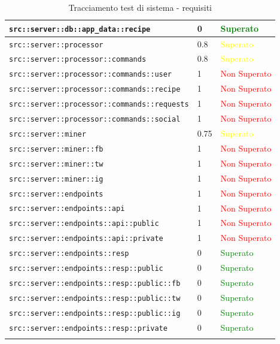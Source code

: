 \begin{center}
\begin{longtable}{| p{8.5cm} | p{3.5cm} | p{3cm} |}
					\hline
					\texttt{src::server::db::app\_data::recipe} & 0 & \textcolor{green}{Superato}\\
					\hline
					\texttt{src::server::processor} & 0.8 & \textcolor{yellow}{Superato}\\
					\hline
					\texttt{src::server::processor::commands} & 0.8 & \textcolor{yellow}{Superato}\\
					\hline
					\texttt{src::server::processor::commands::user} & 1 & \textcolor{red}{Non Superato}\\
					\hline
					\texttt{src::server::processor::commands::recipe} & 1 & \textcolor{red}{Non Superato}\\
					\hline
					\texttt{src::server::processor::commands::requests} & 1 & \textcolor{red}{Non Superato}\\
					\hline
					\texttt{src::server::processor::commands::social} & 1 & \textcolor{red}{Non Superato}\\
					\hline
					\texttt{src::server::miner} & 0.75 & \textcolor{yellow}{Superato}\\
					\hline
					\texttt{src::server::miner::fb} & 1 & \textcolor{red}{Non Superato}\\
					\hline
					\texttt{src::server::miner::tw} & 1 & \textcolor{red}{Non Superato}\\
					\hline
					\texttt{src::server::miner::ig} & 1 & \textcolor{red}{Non Superato}\\
					\hline
					\texttt{src::server::endpoints} & 1 & \textcolor{red}{Non Superato}\\
					\hline
					\texttt{src::server::endpoints::api} & 1 & \textcolor{red}{Non Superato}\\
					\hline
					\texttt{src::server::endpoints::api::public} & 1 & \textcolor{red}{Non Superato}\\
					\hline
					\texttt{src::server::endpoints::api::private} & 1 & \textcolor{red}{Non Superato}\\
					\hline
					\texttt{src::server::endpoints::resp} & 0 & \textcolor{green}{Superato}\\
					\hline
					\texttt{src::server::endpoints::resp::public} & 0 & \textcolor{green}{Superato}\\
					\hline
					\texttt{src::server::endpoints::resp::public::fb} & 0 & \textcolor{green}{Superato}\\
					\hline
					\texttt{src::server::endpoints::resp::public::tw} & 0 & \textcolor{green}{Superato}\\
					\hline
					\texttt{src::server::endpoints::resp::public::ig} & 0 & \textcolor{green}{Superato}\\
					\hline
					\texttt{src::server::endpoints::resp::private} & 0 & \textcolor{green}{Superato}\\
					\hline
					\caption{Tracciamento test di sistema - requisiti}
				\end{longtable}
				\egroup
			\end{center}		
			
